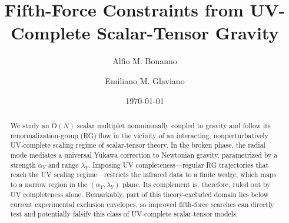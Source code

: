 \documentclass[reprint,superscriptaddress,amsmath,amssymb,aps,prl,floatfix]{revtex4-2}
\newcommand{\alphay}{\alpha_Y}
\newcommand{\lamy}{\lambda_Y}
\begin{document}
\title{Fifth-Force Constraints from UV-Complete Scalar-Tensor Gravity}


    \author{Alfio M. Bonanno}

	\author{Emiliano M. Glaviano}


\date{\today}



\begin{abstract}
\noindent We study an O$(N)$ scalar multiplet nonminimally coupled to gravity and follow its renormalization-group (RG) flow in the vicinity of an interacting, nonperturbatively UV-complete scaling regime of scalar-tensor theory. In the broken phase, the radial mode mediates a universal Yukawa correction to Newtonian gravity, parametrized by a strength $\alphay$ and range $\lamy$. Imposing UV completeness—regular RG trajectories that reach the UV scaling regime—restricts the infrared data to a finite wedge, which maps to a narrow region in the $(\alphay,\lamy)$ plane. Its complement is, therefore, ruled out by UV completeness alone. Remarkably, part of this theory-excluded domain lies below current experimental exclusion envelopes, so improved fifth-force searches can directly test and potentially falsify this class of UV-complete scalar-tensor models.
\end{abstract}

\maketitle
\end{document}
